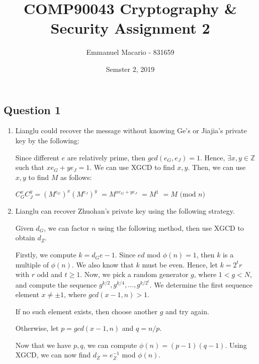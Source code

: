 \documentclass[12pt]{article}
\author{Emmanuel Macario - 831659}
\title{COMP90043 Cryptography \& Security Assignment 2}
\date{Semster 2, 2019}
\begin{document}
\maketitle

\subsection*{Question 1}

\begin{enumerate}
\item Lianglu could recover the message without knowing Ge's or Jiajia's private key by the following:

Since different $e$ are relatively prime, then $gcd(e_{G}, e_{J})=1$. Hence, $\exists x, y \in \mathbb{Z}$ such 
that $xe_{G}+ye_{J}=1$. We can use XGCD to find $x, y$. Then, we can use $x,y$ to find $M$ as follows:


\begin{center}
$C_{G}^{x} C_{J}^{y} = (M^{e_{G}})^{x} (M^{e_{J}})^{y}$
$                                  = M^{{x e_{G}}+{y e_{J}}}$
$                                  = M^{1}$
$                                  = M \text{ (mod }n)$

\end{center}

\item Lianglu can recover Zhuohan's private key using the following strategy.

Given $d_{G}$, we can factor $n$ using the following method, then use XGCD to obtain $d_{Z}$.

Firstly, we compute $k=d_{G}e - 1$. Since $ed$ mod $\phi (n) = 1$, then $k$ is a multiple of $\phi (n)$. 
We also know that $k$ must be even. Hence, let $k=2^{t}r$ with $r$ odd and $t \geq 1$. Now, we pick a random
generator $g$, where $1 < g < N$, and compute the sequence $g^{k/2}, g^{k/4}, \dots, g^{k/2^{t}}$. We determine
the first sequence element $x \neq \pm 1$, where $gcd(x-1, n) > 1$.

If no such element exists, then choose another $g$ and try again.

Otherwise, let $p = gcd(x-1, n)$ and $q = n/p$.


Now that we have $p, q$, we can compute $\phi (n) = (p-1)(q-1)$. Using XGCD, we can now find
$d_{Z} = e_{Z}^{-1}$ mod $\phi (n)$.


\end{enumerate}


\end{document}
